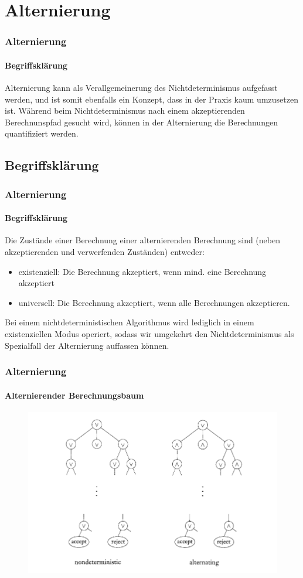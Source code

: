\section{Alternierung}

\begin{frame}
    \frametitle{Alternierung}
    \framesubtitle{Begriffsklärung}
    Alternierung kann als Verallgemeinerung des Nichtdeterminismus aufgefasst werden, und ist somit ebenfalls ein Konzept, dass in der Praxis kaum umzusetzen ist.
    Während beim Nichtdeterminismus nach einem akzeptierenden Berechnunspfad gesucht wird, können in der Alternierung die Berechnungen quantifiziert werden.
\end{frame}

\subsection{Begriffsklärung}
\begin{frame}
    \frametitle{Alternierung}
    \framesubtitle{Begriffsklärung}
    Die Zustände einer Berechnung einer alternierenden Berechnung sind (neben akzeptierenden und verwerfenden Zuständen) entweder:
    \begin{itemize}
        \item existenziell: Die Berechnung akzeptiert, wenn mind. eine Berechnung akzeptiert
        \item universell: Die Berechnung akzeptiert, wenn alle Berechnungen akzeptieren.
    \end{itemize}
    Bei einem nichtdeterministischen Algorithmus wird lediglich in einem existenziellen Modus operiert,
    sodass wir umgekehrt den Nichtdeterminismus als Spezialfall der Alternierung auffassen können.

\end{frame}


\begin{frame}
    \frametitle{Alternierung}
    \framesubtitle{Alternierender Berechnungsbaum \cite[S.409]{sipser_introduction_2012}}
     \begin{figure}
        \centering
        \includegraphics[scale=0.5]{Bilder/Alternierender Berechnugspfad.PNG}
        \label{Alternierende Berechung}
    \end{figure}

\end{frame}

